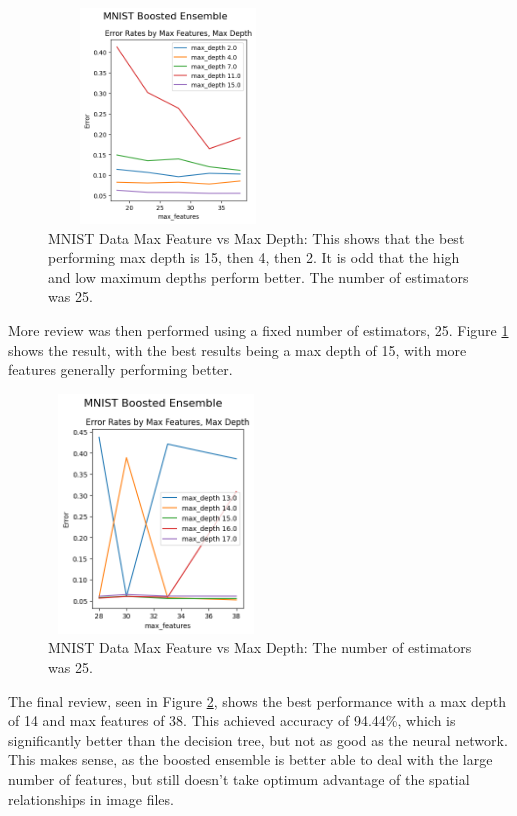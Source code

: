 \documentclass[letterpaper]{article} %
\begin{document}
\begin{figure}[h]
\centering
\includegraphics[width=2.5in, height=2.25in]{figures/MNIST_Boosted_Ensemble_boosting_2.png}
\caption{MNIST Data Max Feature vs Max Depth:  This shows that the best performing max depth is 15, then 4, then 2.  It is odd that the high and low maximum depths perform better. The number of estimators was 25.  }
\label{fig:boosting_mnist_2}
\end{figure}

More review was then performed using a fixed number of estimators, 25. Figure \ref{fig:boosting_mnist_2} shows the result, with the best results being a max depth of 15, with more features generally performing better.

\begin{figure}[h]
\centering
\includegraphics[width=2.25in, height=2.5in]{figures/MNIST_Boosted_Ensemble_boosting_3.png}
\caption{MNIST Data Max Feature vs Max Depth:  The number of estimators was 25.  }
\label{fig:boosting_mnist_3}
\end{figure}

The final review, seen in Figure \ref{fig:boosting_mnist_3}, shows the best performance with a max depth of 14 and max features of 38.  This achieved accuracy of 94.44\%, which is significantly better than the decision tree, but not as good as the neural network.  This makes sense, as the boosted ensemble is better able to deal with the large number of features, but still doesn't take optimum advantage of the spatial relationships in image files.
\end{document}
